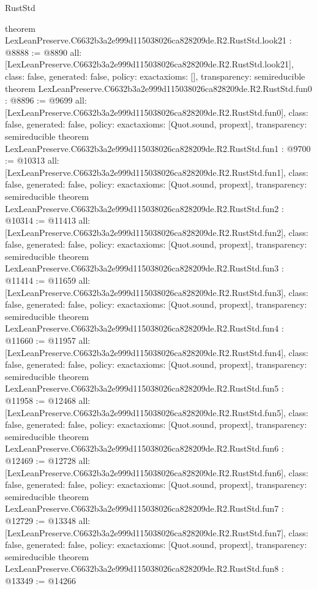 \begin{lexlean}{RustStd}
\begin{coremodule}
{}
theorem LexLeanPreserve.C6632b3a2e999d115038026ca828209de.R2.RustStd.look21 : @8888 := @8890 {
  all: [LexLeanPreserve.C6632b3a2e999d115038026ca828209de.R2.RustStd.look21],
  class: false,
  generated: false,
  policy: exact{axioms: []},
  transparency: semireducible
}
theorem LexLeanPreserve.C6632b3a2e999d115038026ca828209de.R2.RustStd.fun0 : @8896 := @9699 {
  all: [LexLeanPreserve.C6632b3a2e999d115038026ca828209de.R2.RustStd.fun0],
  class: false,
  generated: false,
  policy: exact{axioms: [Quot.sound, propext]},
  transparency: semireducible
}
theorem LexLeanPreserve.C6632b3a2e999d115038026ca828209de.R2.RustStd.fun1 : @9700 := @10313 {
  all: [LexLeanPreserve.C6632b3a2e999d115038026ca828209de.R2.RustStd.fun1],
  class: false,
  generated: false,
  policy: exact{axioms: [Quot.sound, propext]},
  transparency: semireducible
}
theorem LexLeanPreserve.C6632b3a2e999d115038026ca828209de.R2.RustStd.fun2 : @10314 := @11413 {
  all: [LexLeanPreserve.C6632b3a2e999d115038026ca828209de.R2.RustStd.fun2],
  class: false,
  generated: false,
  policy: exact{axioms: [Quot.sound, propext]},
  transparency: semireducible
}
theorem LexLeanPreserve.C6632b3a2e999d115038026ca828209de.R2.RustStd.fun3 : @11414 := @11659 {
  all: [LexLeanPreserve.C6632b3a2e999d115038026ca828209de.R2.RustStd.fun3],
  class: false,
  generated: false,
  policy: exact{axioms: [Quot.sound, propext]},
  transparency: semireducible
}
theorem LexLeanPreserve.C6632b3a2e999d115038026ca828209de.R2.RustStd.fun4 : @11660 := @11957 {
  all: [LexLeanPreserve.C6632b3a2e999d115038026ca828209de.R2.RustStd.fun4],
  class: false,
  generated: false,
  policy: exact{axioms: [Quot.sound, propext]},
  transparency: semireducible
}
theorem LexLeanPreserve.C6632b3a2e999d115038026ca828209de.R2.RustStd.fun5 : @11958 := @12468 {
  all: [LexLeanPreserve.C6632b3a2e999d115038026ca828209de.R2.RustStd.fun5],
  class: false,
  generated: false,
  policy: exact{axioms: [Quot.sound, propext]},
  transparency: semireducible
}
theorem LexLeanPreserve.C6632b3a2e999d115038026ca828209de.R2.RustStd.fun6 : @12469 := @12728 {
  all: [LexLeanPreserve.C6632b3a2e999d115038026ca828209de.R2.RustStd.fun6],
  class: false,
  generated: false,
  policy: exact{axioms: [Quot.sound, propext]},
  transparency: semireducible
}
theorem LexLeanPreserve.C6632b3a2e999d115038026ca828209de.R2.RustStd.fun7 : @12729 := @13348 {
  all: [LexLeanPreserve.C6632b3a2e999d115038026ca828209de.R2.RustStd.fun7],
  class: false,
  generated: false,
  policy: exact{axioms: [Quot.sound, propext]},
  transparency: semireducible
}
theorem LexLeanPreserve.C6632b3a2e999d115038026ca828209de.R2.RustStd.fun8 : @13349 := @14266 {
}
\end{coremodule}
\end{lexlean}
